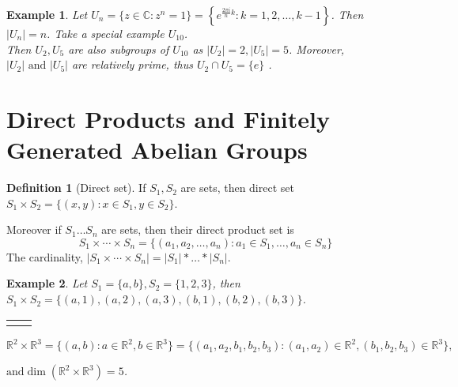 \documentclass{article}
\theoremstyle{MyNonumberplain}
\theoremstyle{break}
\newcommand{\nline}{\begin{tabular}{ll}&\\\end{tabular}}
\newcommand{\infixand}{\text{ and }}
\theoremstyle{break}
\newtheorem{example}{Example}[section]
\theoremstyle{break}
\theoremstyle{definition}
\theoremstyle{break}
\newtheorem{definition}{Definition}[section]
\begin{document}
\begin{expbox}
    \begin{example}
        Let $U_n = \{ z \in \mathbb{C}: z^n = 1 \} = \left\{ e^{\frac{2 \pi i}{n} k} :
        k = 1, 2, \ldots, k - 1 \right\}$. Then $| U_n | = n$. Take a special example
        $U_{10}$.\\

        Then $U_2, U_5$ are also subgroups of $U_{10}$ as $| U_2 | = 2, | U_5 | = 5$.
        Moreover, $| U_2 | \infixand | U_5 |$ are relatively prime, thus $U_2 \cap U_5
        = \{ e \}$ . 
    \end{example}
\end{expbox}

\newpage

\section{Direct Products and Finitely Generated Abelian Groups}

\begin{defbox}
    \begin{definition}[Direct set]
        If $S_1, S_2$ are sets, then direct set $S_1 \times S_2 = \{ (x, y) : x \in
        S_1, y \in S_2 \}$.

        Moreover if $S_1 \ldots S_n$ are sets, then their direct product set is
        \[ S_1 \times \cdots \times S_n = \{ (a_1, a_2, \ldots, a_n) : a_1 \in S_1,
        \ldots, a_n \in S_n \} \]
        The cardinality, $| S_1 \times \cdots \times S_n | = | S_1 | \ast \ldots \ast
        | S_n |$.
    \end{definition}
\end{defbox}

\begin{expbox}
    \begin{example}
        Let $S_1 = \{ a, b \}, S_2 = \{ 1, 2, 3 \}$, then $S_1 \times S_2 = \{ (a, 1),
        (a, 2), (a, 3), (b, 1), (b, 2), (b, 3) \}$.

        \nline

        $\mathbb{R}^2 \times \mathbb{R}^3 = \{ (a, b) : a \in \mathbb{R}^2, b \in
        \mathbb{R}^3 \} = \{ (a_1, a_2, b_1, b_2, b_3) : (a_1, a_2) \in \mathbb{R}^2,
        (b_1, b_2, b_3) \in \mathbb{R}^3 \},$
        
        $\text{and} \dim (\mathbb{R}^2 \times \mathbb{R}^3) = 5$.
    \end{example}
\end{expbox}
\end{document}
